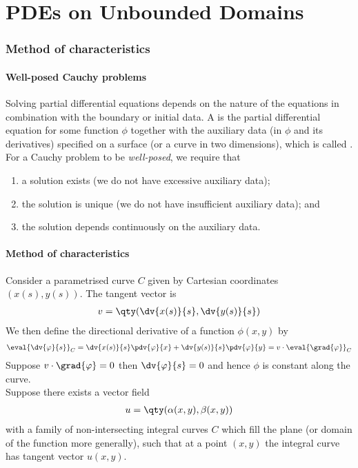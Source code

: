 \part{PDEs on Unbounded Domains}

\section{Method of characteristics}

\subsection{Well-posed Cauchy problems}
Solving partial differential equations depends on the nature of the equations in combination with the boundary or initial data.
A  is the partial differential equation for some function $\phi$ together with the auxiliary data (in $\phi$ and its derivatives) specified on a surface (or a curve in two dimensions), which is called .
For a Cauchy problem to be \textit{well-posed}, we require that
\begin{enumerate}
	\item a solution exists (we do not have excessive auxiliary data);
	\item the solution is unique (we do not have insufficient auxiliary data); and
	\item the solution depends continuously on the auxiliary data.
\end{enumerate}

\subsection{Method of characteristics}
Consider a parametrised curve $C$ given by Cartesian coordinates $(x(s), y(s))$.
The tangent vector is
\begin{align*}
	v = \qty(\dv{x(s)}{s}, \dv{y(s)}{s})
\end{align*}
We then define the directional derivative of a function $\phi(x,y)$ by
\begin{align} \label{eq:9.1}
	\eval{\dv{\phi}{s}}_C = \dv{x(s)}{s} \pdv{\phi}{x} + \dv{y(s)}{s}\pdv{\phi}{y} = v \cdot \eval{\grad{\phi}}_C
\end{align}
Suppose $v \cdot \grad{\phi} = 0$ then $\dv{\phi}{s} = 0$ and hence $\phi$ is constant along the curve. \\
Suppose there exists a vector field
\begin{align} \label{eq:9.2}
	u = \qty(\alpha(x,y), \beta(x,y))
\end{align}
with a family of non-intersecting integral curves $C$ which fill the plane (or domain of the function more generally), such that at a point $(x,y)$ the integral curve has tangent vector $u(x,y)$.

